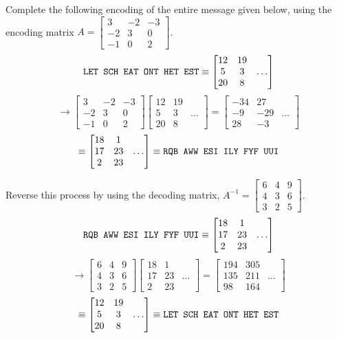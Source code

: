 \begin{applicationActivities}
\begin{activity}{10}
Complete the following encoding of the entire message given below,
using the encoding matrix \(A=\begin{bmatrix}3&-2&-3\\-2&3&0\\-1&0&2\end{bmatrix}\).
\[
\text{\texttt{LET SCH EAT ONT HET EST}}
\equiv
\begin{bmatrix}12&19\\5&3&\dots\\20&8\end{bmatrix}
\]
\[
\to
\begin{bmatrix}3&-2&-3\\-2&3&0\\-1&0&2\end{bmatrix}\begin{bmatrix}12&19\\5&3&\dots\\20&8\end{bmatrix}=
\begin{bmatrix}-34&27\\-9&-29&\dots\\28&-3\end{bmatrix}
\]
\[
\equiv
\begin{bmatrix}18&1\\17&23&\dots\\2&23\end{bmatrix}
\equiv
\text{\texttt{RQB AWW ESI ILY FYF UUI}}
\]
\end{activity}

\begin{activity}{10}
Reverse this process by using the decoding matrix,
\(A^{-1}=\begin{bmatrix}6&4&9\\4&3&6\\3&2&5\end{bmatrix}\).
\[
\text{\texttt{RQB AWW ESI ILY FYF UUI}}
\equiv
\begin{bmatrix}18&1\\17&23&\dots\\2&23\end{bmatrix}
\]
\[
\to
\begin{bmatrix}6&4&9\\4&3&6\\3&2&5\end{bmatrix}\begin{bmatrix}18&1\\17&23&\dots\\2&23\end{bmatrix}
=
\begin{bmatrix}194&305\\135&211&\dots\\98&164\end{bmatrix}
\]
\[
\equiv
\begin{bmatrix}12&19\\5&3&\dots\\20&8\end{bmatrix}
\equiv
\text{\texttt{LET SCH EAT ONT HET EST}}
\]
\end{activity}
\end{applicationActivities}

